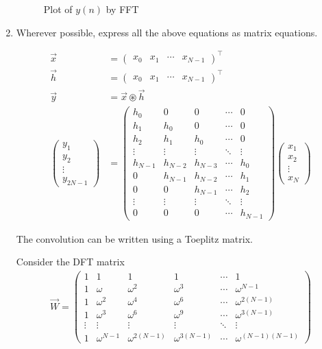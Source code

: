 \documentclass[journal,12pt,twocolumn]{IEEEtran}
\newcommand{\myvec}[1]{\ensuremath{\begin{pmatrix}#1\end{pmatrix}}}
\renewcommand\thesection{\arabic{section}}
\begin{document}
\begin{enumerate}[label=\thesection.\arabic*]
\begin{figure}[!ht]
\caption{Plot of $y(n)$ by FFT}
\label{fig:xk}
\end{figure}
\item Wherever possible, express all the above equations as matrix equations. \\
\solution

\begin{align}
     \vec{x} &= \myvec{x_0 & x_1	 & \cdots & x_{N-1}}^\top \\
     \vec{h} &= \myvec{x_0 & x_1	 & \cdots & x_{N-1}}^\top \\
     \vec{y} &= \vec{x} \circledast \vec{h} \\
     \myvec{y_1 \\ y_2 \\ \vdots \\ y_{2N - 1}} &= \myvec{
          h_0 & 0 & 0 & \cdots & 0 \\
          h_1 & h_0 & 0 & \cdots & 0 \\
          h_2 & h_1 & h_0 & \cdots & 0 \\
          \vdots & \vdots & \vdots & \ddots & \vdots \\
          h_{N-1} & h_{N-2} & h_{N-3} & \cdots & h_0 \\
          0 & h_{N-1} & h_{N-2} & \cdots & h_1 \\
          0 & 0 & h_{N-1} & \cdots & h_2 \\
          \vdots & \vdots & \vdots & \ddots & \vdots \\
          0 & 0 & 0 & \cdots & h_{N-1}
     }		
     \myvec{x_1\\x_2\\ \vdots \\x_N}
\end{align}

The convolution can be written using a Toeplitz matrix. 

Consider the DFT matrix
\begin{align}
     \vec{W} = \myvec{
          1 & 1 & 1 & 1 & \cdots & 1 \\
          1 & \omega & \omega^2 & \omega^3 & \cdots & \omega^{N-1} \\
          1 & \omega^2 & \omega^4 & \omega^6 & \cdots & \omega^{2(N-1)} \\
          1 & \omega^3 & \omega^6 & \omega^9 & \cdots & \omega^{3(N-1)} \\
          \vdots & \vdots & \vdots & \vdots & \ddots & \vdots \\ 
          1 & \omega^{N-1} & \omega^{2(N-1)} & \omega^{3(N-1)} & \cdots & \omega^{(N-1)(N-1)}
     }
\end{align}


\end{enumerate}
\end{document}
